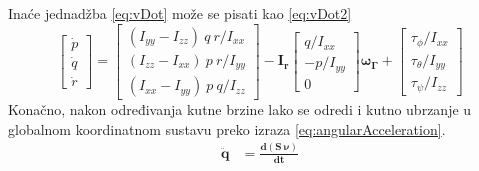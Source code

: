 \documentclass[times, utf8, diplomski]{fer}
\begin{document}
Inaće jednadžba \ref{eq:vDot} može se pisati kao \ref{eq:vDot2}
\begin{equation}
	\begin{bmatrix}
	\dot{p} \\
	\dot{q} \\
	\dot{r}
	\end{bmatrix}
	=
	\begin{bmatrix}
	(I_{yy}-I_{zz})~q~r/I_{xx} \\
	(I_{zz}-I_{xx})~p~r/I_{yy} \\
	(I_{xx}-I_{yy})~p~q/I_{zz}
	\end{bmatrix}
	-\mathbf{I_r}
	\begin{bmatrix}
	q/I_{xx} \\
	-p/I_{yy} \\
	0
	\end{bmatrix}
	\mathbf{\omega_{\Gamma}}+
	\begin{bmatrix}
	\tau_{\phi}/I_{xx} \\
	\tau_{\theta}/I_{yy} \\
	\tau_{\psi}/I_{zz}
	\end{bmatrix}
	\label{eq:vDot2}
\end{equation}
Konačno, nakon određivanja kutne brzine lako se odredi i kutno ubrzanje u globalnom koordinatnom sustavu preko izraza \ref{eq:angularAcceleration}.
\begin{align}
\mathbf{\ddot{q}}&=\mathbf{\frac{d(S~\nu)}{dt}} \label{eq:angularAcceleration}
\end{align}
\end{document}

